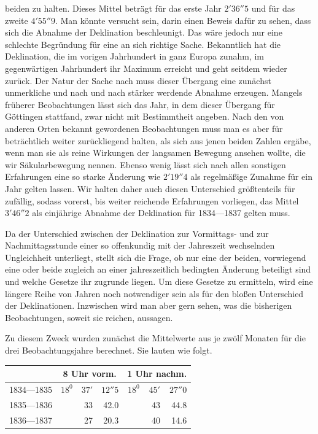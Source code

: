 beiden zu halten. Dieses Mittel beträgt für das erste Jahr $2'36''5$ und für das zweite $4'55''9$. Man könnte versucht sein, darin einen Beweis dafür zu sehen, dass sich die Abnahme der Deklination beschleunigt. Das wäre jedoch nur eine schlechte Begründung für eine an sich richtige Sache. Bekanntlich hat die Deklination, die im vorigen Jahrhundert in ganz Europa zunahm, im gegenwärtigen Jahrhundert ihr Maximum erreicht und geht seitdem wieder zurück. Der Natur der Sache nach muss dieser Übergang eine zunächst unmerkliche und nach und nach stärker werdende Abnahme erzeugen. Mangels früherer Beobachtungen lässt sich das Jahr, in dem dieser Übergang für Göttingen stattfand, zwar nicht mit Bestimmtheit angeben. Nach den von anderen Orten bekannt gewordenen Beobachtungen muss man es aber für beträchtlich weiter zurückliegend halten, als sich aus jenen beiden Zahlen ergäbe, wenn man sie als reine Wirkungen der langsamen Bewegung ansehen wollte, die wir Säkularbewegung nennen. Ebenso wenig lässt sich nach allen sonstigen Erfahrungen eine so starke Änderung wie $2'19''4$ als regelmäßige Zunahme für ein Jahr gelten lassen. Wir halten daher auch diesen Unterschied größtenteils für zufällig, sodass vorerst, bis weiter reichende Erfahrungen vorliegen, das Mittel $3'46''2$ als einjährige Abnahme der Deklination für 1834---1837 gelten muss.

Da der Unterschied zwischen der Deklination zur Vormittags- und zur Nachmittagsstunde einer so offenkundig mit der Jahreszeit wechselnden Ungleichheit unterliegt, stellt sich die Frage, ob nur eine der beiden, vorwiegend eine oder beide zugleich an einer jahreszeitlich bedingten Änderung beteiligt sind und welche Gesetze ihr zugrunde liegen. Um diese Gesetze zu ermitteln, wird eine längere Reihe von Jahren noch notwendiger sein als für den bloßen Unterschied der Deklinationen. Inzwischen wird man aber gern sehen, was die bisherigen Beobachtungen, soweit sie reichen, aussagen.

Zu diesem Zweck wurden zunächst die Mittelwerte aus je zwölf Monaten für die drei Beobachtungsjahre berechnet. Sie lauten wie folgt.
\begin{center}\small
\begin{tabular}{l|rrr|rrr}
&\multicolumn{3}{c|}{8 Uhr vorm.}&\multicolumn{3}{c}{1 Uhr nachm.}\\\hline
1834---1835&$18^0$&$37'$&$12''5$&$18^0$&$45'$&$27''0$\\
1835---1836&&33&42.0&&43&44.8\\
1836---1837&&27&20.3&&40&14.6
\end{tabular}
\end{center}

